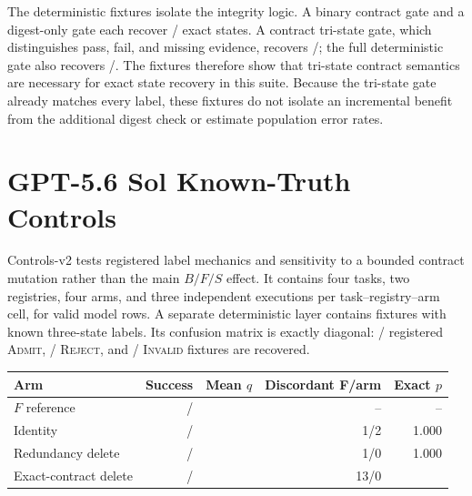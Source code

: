 The deterministic fixtures isolate the integrity logic. A binary contract gate and a digest-only gate each recover \AblationBinaryContractCorrect{}/\AblationTotalFixtures{} exact states. A contract tri-state gate, which distinguishes pass, fail, and missing evidence, recovers \AblationTriStateCorrect{}/\AblationTotalFixtures{}; the full deterministic gate also recovers \AblationFullGateCorrect{}/\AblationTotalFixtures{}. The fixtures therefore show that tri-state contract semantics are necessary for exact state recovery in this suite. Because the tri-state gate already matches every label, these fixtures do not isolate an incremental benefit from the additional digest check or estimate population error rates.

\section{GPT-5.6 Sol Known-Truth Controls}
\label{app:controls}

Controls-v2 tests registered label mechanics and sensitivity to a bounded contract mutation rather than the main $B/F/S$ effect. It contains four tasks, two registries, four arms, and three independent executions per task--registry--arm cell, for \ControlRows{} valid model rows. A separate deterministic layer contains \ControlDeterministicCells{} fixtures with known three-state labels. Its confusion matrix is exactly diagonal: \ControlAdmitTruth{}/\ControlAdmitTruth{} registered \textsc{Admit}, \ControlRejectTruth{}/\ControlRejectTruth{} \textsc{Reject}, and \ControlInvalidTruth{}/\ControlInvalidTruth{} \textsc{Invalid} fixtures are recovered.

\begin{center}
\label{tab:controls-v2}
\scriptsize
\setlength{\tabcolsep}{2pt}
\begin{tabular}{lrrrr}
\toprule
Arm & Success & Mean $q$ & Discordant F/arm & Exact $p$ \\
\midrule
$F$ reference & \ControlFSuccess{}/\ControlRowsPerArm{} & \ControlFScore{} & -- & -- \\
Identity & \ControlIdentitySuccess{}/\ControlRowsPerArm{} & \ControlIdentityScore{} & 1/2 & 1.000 \\
Redundancy delete & \ControlRedundancySuccess{}/\ControlRowsPerArm{} & \ControlRedundancyScore{} & 1/0 & 1.000 \\
Exact-contract delete & \ControlNegativeSuccess{}/\ControlRowsPerArm{} & \ControlNegativeScore{} & 13/0 & \ControlExactP{} \\
\bottomrule
\end{tabular}
\end{center}


